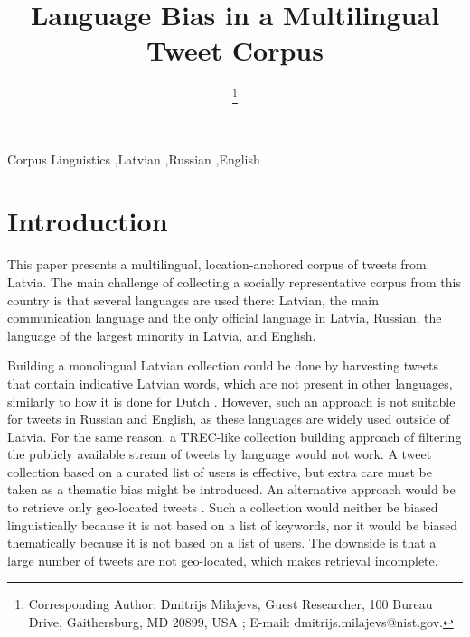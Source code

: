 \documentclass{IOS-Book-Article}
\begin{document}
\begin{frontmatter}              %

\title{Language Bias in a Multilingual Tweet Corpus}

\author[A]{ %
  \thanks{Corresponding Author: Dmitrijs Milajevs, Guest Researcher,
    100 Bureau Drive,
    Gaithersburg, MD 20899, USA%
    ;
    E-mail: dmitrijs.milajevs@nist.gov.}}


\address[A]{Guest Researcher at National Institute of Standards and Technology, Maryland, USA}

%

\begin{keyword}
Corpus Linguistics \sep Latvian \sep Russian \sep English
\end{keyword}
\end{frontmatter}

\thispagestyle{empty}
\pagestyle{empty}

\section*{Introduction}

This paper presents a multilingual, location-anchored corpus of tweets from Latvia. The main challenge of collecting a socially representative corpus from this country is that several languages are used there: Latvian, the main communication language and the only official language in Latvia, Russian, the language of the largest minority in Latvia, and English.

%
Building a monolingual Latvian collection could be done by harvesting tweets that contain indicative Latvian words, which are not present in other languages, similarly to how it is done for Dutch \cite{sang2013}. However, such an approach is not suitable for tweets in Russian and English, as these languages are widely used outside of Latvia.
%
For the same reason, a TREC-like collection building approach \cite{lin2017rts} of filtering the publicly available stream of tweets by language would not work.
%
A tweet collection based on a curated list of users \cite{SANVICENTE16.465,L14-1642} is effective, but extra care must be taken as a thematic bias might be introduced.
%
An alternative approach would be to retrieve only geo-located tweets \cite{milajevs:2017:BUCC}. Such a collection would neither be biased linguistically because it is not based on a list of keywords, nor it would be biased thematically because it is not based on a list of users. The downside is that a large number of tweets are not geo-located, which makes retrieval incomplete.
\end{document}
